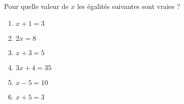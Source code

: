 
\begin{exercice}\label{exo2smath-0282}

    Pour quelle valeur de \( x\) les égalités suivantes sont vraies ?
    \begin{multicols}{2}
        \begin{enumerate}
        \item
            \( x+1=3\)
        \item
            \( 2x=8\)
        \item
            \( x+3=5\)
        \item
            \( 3x+4=35\)
        \item
            \( x-5=10\)
        \item
            \( x+5=3\)
    \end{enumerate}
    \end{multicols}

\end{exercice}
